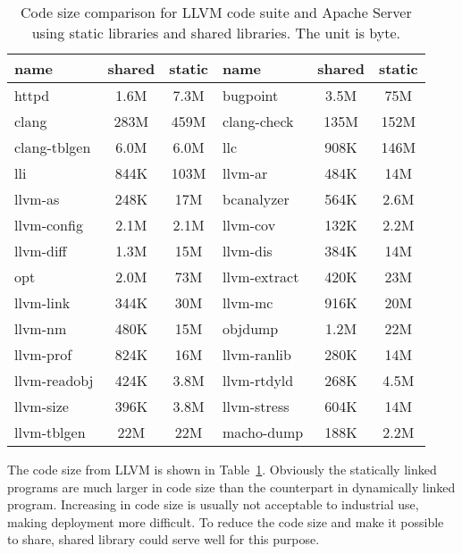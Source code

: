 \begin{table}[ht] \scriptsize
\begin{tabular}{|l|c|c||l|c|c|}
 \hline
 name & shared & static & name & shared & static \\
 \hline
httpd             &     1.6M & 7.3M &  bugpoint          &     3.5M & 75M   \\
clang             &     283M & 459M &   clang-check       &     135M & 152M   \\
clang-tblgen      &     6.0M & 6.0M &   llc               &     908K & 146M   \\
lli               &     844K & 103M &   llvm-ar           &     484K & 14M   \\
llvm-as           &     248K & 17M  &  bcanalyzer   &     564K & 2.6M   \\
llvm-config       &     2.1M & 2.1M &   llvm-cov          &     132K & 2.2M   \\
llvm-diff         &     1.3M & 15M  &  llvm-dis          &     384K & 14M   \\
 opt               &     2.0M & 73M &   llvm-extract      &     420K & 23M   \\
llvm-link         &     344K & 30M  &  llvm-mc           &     916K & 20M   \\
llvm-nm           &     480K & 15M  &  objdump      &     1.2M & 22M   \\
llvm-prof         &     824K & 16M  &  llvm-ranlib       &     280K & 14M   \\
llvm-readobj      &     424K & 3.8M &   llvm-rtdyld       &     268K & 4.5M   \\
llvm-size         &     396K & 3.8M &   llvm-stress       &     604K & 14M   \\
llvm-tblgen       &     22M & 22M   & macho-dump        &     188K & 2.2M   \\

\hline
\end{tabular}
\caption{Code size comparison for LLVM code suite and Apache Server using
static libraries and shared libraries. The unit is byte.}
\label{tab:codesize}
\end{table}
The code size from LLVM is shown in Table~\ref{tab:codesize}. Obviously the
statically linked programs are much larger in code size than the counterpart
in dynamically linked program. Increasing in code size is usually not
acceptable to industrial use, making deployment more difficult. To reduce
the code size and make it possible to share, shared library could serve
well for this purpose.

